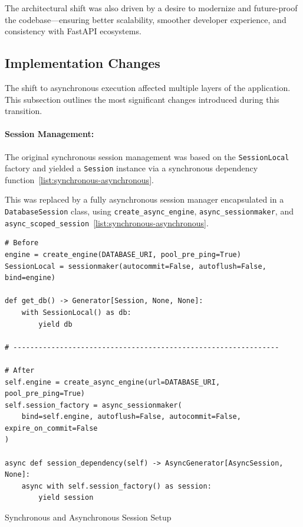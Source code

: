 The architectural shift was also driven by a desire to modernize and future-proof the codebase—ensuring better scalability, smoother developer experience, and consistency with FastAPI ecosystems.

\subsection{Implementation Changes}

The shift to asynchronous execution affected multiple layers of the application. This subsection outlines the most significant changes introduced during this transition.

\paragraph{Session Management:}
The original synchronous session management was based on the \texttt{SessionLocal} factory and yielded a \texttt{Session} instance via a synchronous dependency function~\ref{list:synchronous-asynchronous}.

This was replaced by a fully asynchronous session manager encapsulated in a \texttt{DatabaseSession} class, using \texttt{create\_async\_engine}, \texttt{async\_sessionmaker}, and \texttt{async\_scoped\_session}~\ref{list:synchronous-asynchronous}.

\begin{listing}
  \begin{verbatim}
# Before
engine = create_engine(DATABASE_URI, pool_pre_ping=True)
SessionLocal = sessionmaker(autocommit=False, autoflush=False, bind=engine)

def get_db() -> Generator[Session, None, None]:
    with SessionLocal() as db:
        yield db

# ---------------------------------------------------------------

# After
self.engine = create_async_engine(url=DATABASE_URI, pool_pre_ping=True)
self.session_factory = async_sessionmaker(
    bind=self.engine, autoflush=False, autocommit=False, expire_on_commit=False
)

async def session_dependency(self) -> AsyncGenerator[AsyncSession, None]:
    async with self.session_factory() as session:
        yield session
\end{verbatim}
\caption{Synchronous and Asynchronous Session Setup}
\label{list:synchronous-asynchronous}
\end{listing}

